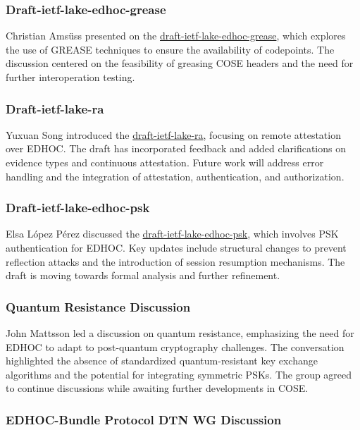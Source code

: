 \documentclass{article}
\begin{document}
\subsubsection{Draft-ietf-lake-edhoc-grease}

Christian Amsüss presented on the \href{https://datatracker.ietf.org/doc/html/draft-ietf-lake-edhoc-grease}{draft-ietf-lake-edhoc-grease}, which explores the use of GREASE techniques to ensure the availability of codepoints. The discussion centered on the feasibility of greasing COSE headers and the need for further interoperation testing.

\subsubsection{Draft-ietf-lake-ra}

Yuxuan Song introduced the \href{https://datatracker.ietf.org/doc/html/draft-ietf-lake-ra}{draft-ietf-lake-ra}, focusing on remote attestation over EDHOC. The draft has incorporated feedback and added clarifications on evidence types and continuous attestation. Future work will address error handling and the integration of attestation, authentication, and authorization.

\subsubsection{Draft-ietf-lake-edhoc-psk}

Elsa López Pérez discussed the \href{https://datatracker.ietf.org/doc/html/draft-ietf-lake-edhoc-psk}{draft-ietf-lake-edhoc-psk}, which involves PSK authentication for EDHOC. Key updates include structural changes to prevent reflection attacks and the introduction of session resumption mechanisms. The draft is moving towards formal analysis and further refinement.

\subsubsection{Quantum Resistance Discussion}

John Mattsson led a discussion on quantum resistance, emphasizing the need for EDHOC to adapt to post-quantum cryptography challenges. The conversation highlighted the absence of standardized quantum-resistant key exchange algorithms and the potential for integrating symmetric PSKs. The group agreed to continue discussions while awaiting further developments in COSE.

\subsubsection{EDHOC-Bundle Protocol DTN WG Discussion}
\end{document}
